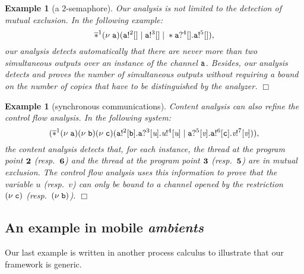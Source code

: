 \documentclass{article}
\newcommand{\boxexample}{$\Box$}
\newtheorem{example}[thm]{Example}
\newcommand{\ambients}{\emph{ambients}}
\newcommand{\nuu}{\nu\;}
\newcommand{\repli}{\ast}
\newcommand{\rec}{?}
\newcommand{\eme}{!}
\newcommand{\pp}[1]{$\bf{#1}$}
\newcommand{\bang}[1]{\overline{\repli}^{#1}}
\newcommand{\internal}[1]{\textnormal{\texttt{#1}}}
\newcommand{\variable}[1]{\textit{#1}}
\newcommand{\cana}{\internal{a}}
\newcommand{\semlaba}{1}
\newcommand{\semlabb}{2}
\newcommand{\semlabc}{3}
\newcommand{\semlabd}{4}
\newcommand{\semlabe}{5}
\newcommand{\canb}{\internal{b}}
\newcommand{\canc}{\internal{c}}
\newcommand{\varu}{\variable{u}}
\newcommand{\varv}{\variable{v}}
\newcommand{\synlaba}{1}
\newcommand{\synlabb}{2}
\newcommand{\synlabc}{3}
\newcommand{\synlabd}{4}
\newcommand{\synlabe}{5}
\newcommand{\synlabf}{6}
\newcommand{\synlabg}{7}
\begin{document}
{
\begin{example}[a $2$-semaphore]
Our analysis is not limited to the detection of mutual exclusion.
In the following example: 
\begin{equation*}
\bang{\semlaba}(\nuu \cana)(\cana\eme^{\semlabb}[] \;|\; \cana\eme^{\semlabc}[] \;|\; \repli \cana\rec^{\semlabd}[].\cana\eme^{\semlabe}[]),
\end{equation*}
 our analysis detects automatically that 
there are never more than two simultaneous outputs over an instance of the channel $\cana$.
Besides, our analysis detects and proves the number of simultaneous outputs without requiring a bound on the number of copies that have to be distinguished by the analyzer. 
\boxexample
\end{example}}

{\begin{example}[synchronous communications]
Content analysis can also refine the control flow analysis.
In the following system:
\begin{equation*}
(\bang{\synlaba}(\nuu \cana)(\nuu \canb)(\nuu \canc)
(\cana\eme^{\synlabb}[\canb].\cana\rec^{\synlabc}[\varu].\varu\eme^\synlabd[\varu]\;|\;
\cana\rec^{\synlabe}[\varv].\cana\eme^{\synlabf}[\canc].\varv\eme^\synlabg[\varv])),
\end{equation*}
the content analysis detects that, for each instance, the thread at the program point \pp{\synlabb} (resp.~\pp{\synlabf}) and the thread at the program point \pp{\synlabc} (resp.~\pp{\synlabe}) are in mutual exclusion. 
The control flow analysis uses this information to prove that the variable $\varu$ (resp.~$\varv$) can only be bound to a channel opened by the restriction $(\nuu  \canc)$ (resp.~$(\nuu \canb)$).
\boxexample\end{example}}

\subsection{An example in mobile \ambients}

Our last example is written in another process calculus to illustrate that our framework is generic.
\end{document}
